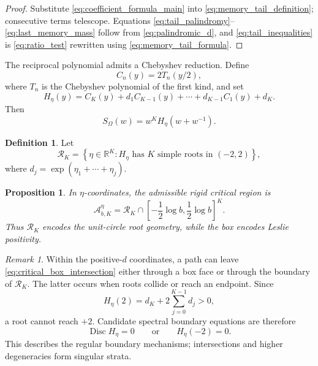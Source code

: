 \documentclass[11pt]{amsart}
\numberwithin{equation}{section}
\theoremstyle{plain}
\newtheorem{proposition}[theorem]{Proposition}
\theoremstyle{definition}
\newtheorem{definition}[theorem]{Definition}
\theoremstyle{remark}
\newtheorem{remark}[theorem]{Remark}
\begin{document}
\begin{proof}
Substitute \eqref{eq:coefficient_formula_main} into \eqref{eq:memory_tail_definition}; consecutive terms telescope.  Equations \eqref{eq:tail_palindromy}--\eqref{eq:last_memory_mass} follow from \eqref{eq:palindromic_d}, and \eqref{eq:tail_inequalities} is \eqref{eq:ratio_test} rewritten using \eqref{eq:memory_tail_formula}.
\end{proof}

The reciprocal polynomial admits a Chebyshev reduction.  Define
\begin{equation}
C_n(y)=2T_n(y/2),
\label{eq:scaled_chebyshev}
\end{equation}
where $T_n$ is the Chebyshev polynomial of the first kind, and set
\begin{equation}
H_\eta(y)
=C_K(y)+d_1C_{K-1}(y)+\cdots+d_{K-1}C_1(y)+d_K.
\label{eq:H_eta}
\end{equation}
Then
\begin{equation}
S_\Omega(w)=w^KH_\eta(w+w^{-1}).
\label{eq:chebyshev_reduction}
\end{equation}

\begin{definition}
\label{def:universal_region}
Let
\begin{equation}
\mathcal R_K
=
\left\{
\eta\in\mathbb R^K:
H_\eta\text{ has }K\text{ simple roots in }(-2,2)
\right\},
\label{eq:universal_region}
\end{equation}
where $d_j=\exp(\eta_1+\cdots+\eta_j)$.
\end{definition}

\begin{proposition}
\label{prop:separation_geometry_positivity}
In $\eta$-coordinates, the admissible rigid critical region is
\begin{equation}
\mathcal A^{\eta}_{b,K}
=
\mathcal R_K
\cap
\left[-\frac12\log b,\frac12\log b\right]^K.
\label{eq:critical_box_intersection}
\end{equation}
Thus $\mathcal R_K$ encodes the unit-circle root geometry, while the box encodes Leslie positivity.
\end{proposition}

\begin{remark}
\label{rem:two_boundary_mechanisms}
Within the positive-$d$ coordinates, a path can leave \eqref{eq:critical_box_intersection} either through a box face or through the boundary of $\mathcal R_K$.  The latter occurs when roots collide or reach an endpoint.  Since
\begin{equation}
H_\eta(2)=d_K+2\sum_{j=0}^{K-1}d_j>0,
\label{eq:H_at_plus_two}
\end{equation}
a root cannot reach $+2$.  Candidate spectral boundary equations are therefore
\begin{equation}
\operatorname{Disc}H_\eta=0
\qquad\text{or}\qquad
H_\eta(-2)=0.
\label{eq:critical_region_boundary}
\end{equation}
This describes the regular boundary mechanisms; intersections and higher degeneracies form singular strata.
\end{remark}
\end{document}
